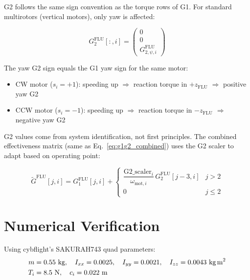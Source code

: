 \documentclass[11pt]{article}
\newcommand{\flu}{\mathrm{FLU}}
\begin{document}
G2 follows the same sign convention as the torque rows of G1.
For standard multirotors (vertical motors), only yaw is affected:

\begin{equation}\label{eq:g2_flu}
    \boxed{
    G_2^{\flu}[:,i] = \begin{pmatrix} 0 \\ 0 \\ G_{2,\psi,i}^{\flu} \end{pmatrix}
    }
\end{equation}

The yaw G2 sign equals the G1 yaw sign for the same motor:
\begin{itemize}
    \item CW motor ($s_i = +1$): speeding up $\Rightarrow$ reaction torque in $+z_{\flu}$
        $\Rightarrow$ positive yaw G2
    \item CCW motor ($s_i = -1$): speeding up $\Rightarrow$ reaction torque in $-z_{\flu}$
        $\Rightarrow$ negative yaw G2
\end{itemize}

G2 values come from system identification, not first principles.
The combined effectiveness matrix (same as Eq.~\ref{eq:g1g2_combined})
uses the G2 scaler to adapt based on operating point:

\begin{equation}
    \widetilde{G}^{\flu}[j,i] = G_1^{\flu}[j,i] +
    \begin{cases}
        \dfrac{\text{G2\_scaler}_i}{\omega_{\mathrm{mot},i}} \, G_2^{\flu}[j-3,i]
        & j > 2 \\[6pt]
        0 & j \le 2
    \end{cases}
\end{equation}

\section{Numerical Verification}

Using cybflight's SAKURAH743 quad parameters:
\begin{align*}
    m &= 0.55 \text{ kg}, \quad I_{xx} = 0.0025, \quad I_{yy} = 0.0021, \quad I_{zz} = 0.0043 \text{ kg\,m}^2 \\
    T_i &= 8.5 \text{ N}, \quad c_i = 0.022 \text{ m}
\end{align*}
\end{document}
